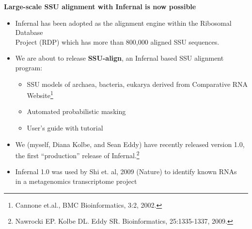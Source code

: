 \documentclass[landscape]{slides}
\begin{document}
\begin{slide}
\begin{center}
\textbf{Large-scale SSU alignment with Infernal is now possible}
\end{center}
\medskip

\small
\begin{itemize}
\item Infernal has been adopted as the alignment engine within the
  Ribosomal Database \\ Project (RDP) which has more than 800,000 aligned
  SSU sequences.

\item We are about to release {\bf SSU-align}, an Infernal based SSU alignment program:
  \begin{itemize}
    \item SSU models of archaea, bacteria, eukarya derived from
      Comparative RNA Website\footnote{Cannone et.al., BMC Bioinformatics, 3:2, 2002.}
    \item Automated probabilistic masking
    \item User's guide with tutorial
  \end{itemize}
\end{itemize}

\normalsize
{}

\small
\begin{itemize}
\item We (myself, Diana Kolbe, and Sean Eddy) have recently released
  version 1.0, \\ the first ``production'' release of
  Infernal.\footnote{Nawrocki EP. Kolbe DL. Eddy SR. Bioinformatics,
    25:1335-1337, 2009.}


\item {Infernal 1.0 was used by Shi et. al, 2009 (Nature) to identify known
  RNAs \\ in a metagenomics transcriptome project}
\end{itemize}

\vfill
\end{slide}
\end{document}
